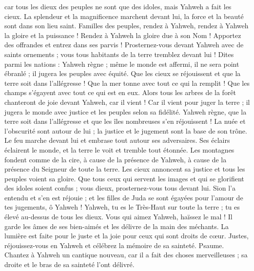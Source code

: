 \begin{multicols}{2}
car tous les dieux des peuples ne sont que des idoles, mais Yahweh a fait les cieux.
La splendeur et la magnificence marchent devant lui, la force et la beauté sont dans son lieu saint.
Familles des peuples, rendez à Yahweh, rendez à Yahweh la gloire et la puissance !
Rendez à Yahweh la gloire due à son Nom ! Apportez des offrandes et entrez dans ses parvis !
Prosternez-vous devant Yahweh avec de saints ornements ; vous tous habitants de la terre tremblez devant lui !
Dites parmi les nations : Yahweh règne ; même le monde est affermi, il ne sera point ébranlé ; il jugera les peuples avec équité.
Que les cieux se réjouissent et que la terre soit dans l’allégresse ! Que la mer tonne avec tout ce qui la remplit !
Que les champs s'égayent avec tout ce qui est en eux. Alors tous les arbres de la forêt chanteront de joie
devant Yahweh, car il vient ! Car il vient pour juger la terre ; il jugera le monde avec justice et les peuples selon sa fidélité.
\VerseOne{}Yahweh règne, que la terre soit dans l’allégresse et que les îles nombreuses s'en réjouissent !
La nuée et l'obscurité sont autour de lui ; la justice et le jugement sont la base de son trône.
Le feu marche devant lui et embrase tout autour ses adversaires.
Ses éclairs éclairent le monde, et la terre le voit et tremble tout étonnée.
Les montagnes fondent comme de la cire, à cause de la présence de Yahweh, à cause de la présence du Seigneur de toute la terre.
Les cieux annoncent sa justice et tous les peuples voient sa gloire.
Que tous ceux qui servent les images et qui se glorifient des idoles soient confus ; vous dieux, prosternez-vous tous devant lui.
Sion l'a entendu et s'en est réjouie ; et les filles de Juda se sont égayées pour l'amour de tes jugements, ô Yahweh !
Yahweh, tu es le Très-Haut sur toute la terre ; tu es élevé au-dessus de tous les dieux.
Vous qui aimez Yahweh, haïssez le mal ! Il garde les âmes de ses bien-aimés et les délivre de la main des méchants.
La lumière est faite pour le juste et la joie pour ceux qui sont droits de cœur.
Justes, réjouissez-vous en Yahweh et célébrez la mémoire de sa sainteté.
\VerseOne{}Psaume. Chantez à Yahweh un cantique nouveau, car il a fait des choses merveilleuses ; sa droite et le bras de sa sainteté l'ont délivré.

\end{multicols}
